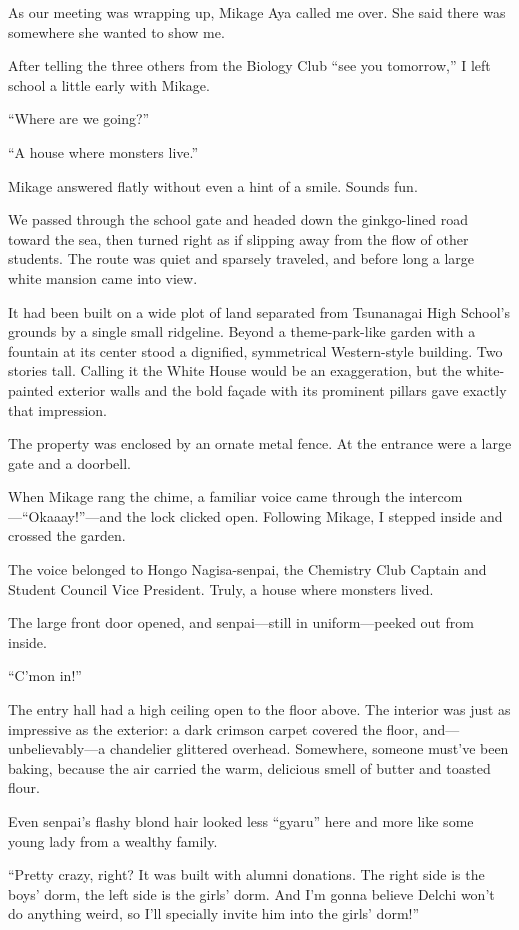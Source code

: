 \documentclass[
    a4paper,
    12pt,
    twoside,
    openany,
    UTF8,
    fontset=windows
]{ctexbook}
\begin{document}
As our meeting was wrapping up, Mikage Aya called me over. She said there was somewhere she wanted to show me.

After telling the three others from the Biology Club ``see you tomorrow,'' I left school a little early with Mikage.

``Where are we going?''

``A house where monsters live.''

Mikage answered flatly without even a hint of a smile. Sounds fun.

We passed through the school gate and headed down the ginkgo-lined road toward the sea, then turned right as if slipping away from the flow of other students. The route was quiet and sparsely traveled, and before long a large white mansion came into view.

It had been built on a wide plot of land separated from Tsunanagai High School's grounds by a single small ridgeline. Beyond a theme-park-like garden with a fountain at its center stood a dignified, symmetrical Western-style building. Two stories tall. Calling it the White House would be an exaggeration, but the white-painted exterior walls and the bold façade with its prominent pillars gave exactly that impression.

The property was enclosed by an ornate metal fence. At the entrance were a large gate and a doorbell.

When Mikage rang the chime, a familiar voice came through the intercom---``Okaaay!''---and the lock clicked open. Following Mikage, I stepped inside and crossed the garden.

The voice belonged to Hongo Nagisa-senpai, the Chemistry Club Captain and Student Council Vice President. Truly, a house where monsters lived.

The large front door opened, and senpai---still in uniform---peeked out from inside.

``C'mon in!''

The entry hall had a high ceiling open to the floor above. The interior was just as impressive as the exterior: a dark crimson carpet covered the floor, and---unbelievably---a chandelier glittered overhead. Somewhere, someone must've been baking, because the air carried the warm, delicious smell of butter and toasted flour.

Even senpai's flashy blond hair looked less ``gyaru'' here and more like some young lady from a wealthy family.

``Pretty crazy, right? It was built with alumni donations. The right side is the boys' dorm, the left side is the girls' dorm. And I'm gonna believe Delchi won't do anything weird, so I'll specially invite him into the girls' dorm!''
\end{document}
